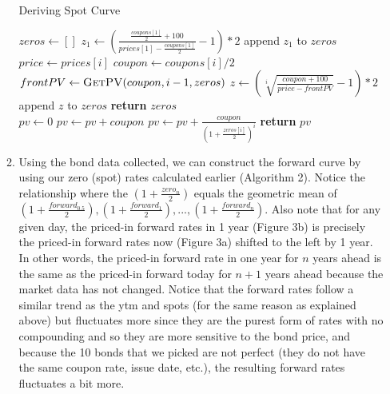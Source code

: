 \documentclass{article}
\begin{document}
\begin{enumerate}
\begin{enumerate}
            \begin{algorithm}[H]
              \caption{Deriving Spot Curve}\label{spot}
              \begin{algorithmic}[1]
                  \State $zeros\gets []$ 
                  \State $z_1\gets (\frac{\frac{coupons[1]}{2} + 100}{prices[1] - \frac{coupons[1]}{2}} - 1) * 2$ 
                  \State append $z_1$ to $zeros$
                   
                    \State $price \gets prices[i]$
                    \State $coupon \gets coupons[i] / 2$
                    \State $frontPV \gets \Call{GetPV}{coupon, i-1, zeros}$ 
                    \State $z \gets (\sqrt[i]{\frac{coupon + 100}{price - frontPV}} - 1) * 2$
                    \State append $z$ to $zeros$
                  \EndFor
                  \State \textbf{return} $zeros$
                \EndFunction
                \[\]
                    \State $pv \gets 0$
                    \State $pv \gets pv + coupon$
                     
                        \State $pv \gets pv + \frac{coupon}{(1 + \frac{zeros[i]}{2})^i}$
                    \EndFor
                    \State \textbf{return} $pv$
                \EndFunction
              \end{algorithmic}
            \end{algorithm}

        \item Using the bond data collected, we can construct the forward curve \cite{chen2022forward} by using our zero (spot) rates calculated earlier (Algorithm 2). Notice the relationship where the $(1 + \frac{zero_n}{2})$ equals the geometric mean of $(1 + \frac{forward_{0.5}}{2}), (1 + \frac{forward_1}{2}), ..., (1 + \frac{forward_n}{2})$. Also note that for any given day, the priced-in forward rates in 1 year (Figure 3b) is precisely the priced-in forward rates now (Figure 3a) shifted to the left by 1 year. In other words, the priced-in forward rate in one year for $n$ years ahead is the same as the priced-in forward today for $n+1$ years ahead because the market data has not changed. Notice that the forward rates follow a similar trend as the ytm and spots (for the same reason as explained above) but fluctuates more since they are the purest form of rates with no compounding and so they are more sensitive to the bond price, and because the 10 bonds that we picked are not perfect (they do not have the same coupon rate, issue date, etc.), the resulting forward rates fluctuates a bit more.
        

\end{enumerate}
\end{enumerate}
\end{document}
